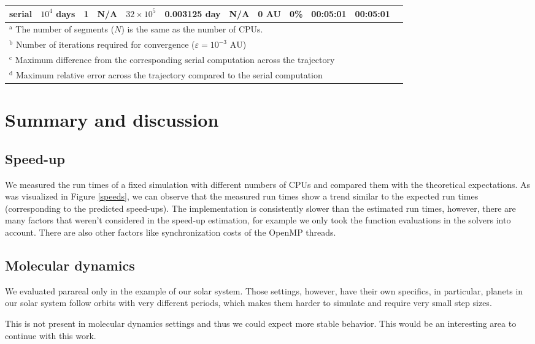\documentclass[conference]{IEEEtran}
\begin{document}
\begin{table*}[htbp]
\begin{center}
\begin{tabular}{crrrrrrrrrcc}
serial & $10^4$ days & 1 & N/A & $32\times10^5$ & 0.003125 day & N/A & 0 AU & 0\% & 00:05:01 & 00:05:01 \\
\bottomrule
\multicolumn{11}{l}{$^{\mathrm{a}}$ The number of segments ($N$) is the same as the number of CPUs.} \\
\multicolumn{11}{l}{$^{\mathrm{b}}$ Number of iterations required for convergence ($\varepsilon = 10^{-3}\text{ AU}$)} \\
\multicolumn{11}{l}{$^{\mathrm{c}}$ Maximum difference from the corresponding serial computation across the trajectory} \\
\multicolumn{11}{l}{$^{\mathrm{d}}$ Maximum relative error across the trajectory compared to the serial computation}
\end{tabular}
\label{runtimes}
\end{center}
\end{table*}

\section{Summary and discussion}

\subsection{Speed-up}
We measured the run times of a fixed simulation with different numbers of CPUs and compared them with the theoretical expectations. As was visualized in Figure \ref{speeds}, we can observe that the measured run times show a trend similar to the expected run times (corresponding to the predicted speed-ups). The implementation is consistently slower than the estimated run times, however, there are many factors that weren't considered in the speed-up estimation, for example we only took the function evaluations in the solvers into account. There are also other factors like synchronization costs of the OpenMP threads.

\subsection{Molecular dynamics}
We evaluated parareal only in the example of our solar system. Those settings, however, have their own specifics, in particular, planets in our solar system follow orbits with very different periods, which makes them harder to simulate and require very small step sizes. 

This is not present in molecular dynamics settings and thus we could expect more stable behavior. This would be an interesting area to continue with this work.
\end{document}
